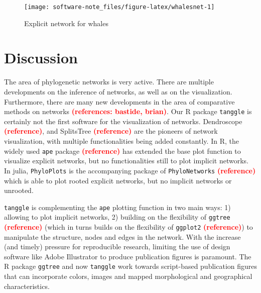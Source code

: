 \documentclass[]{article}
\begin{document}
\begin{figure}[H]

{\centering \texttt{[image: software-note\_files/figure-latex/whalesnet-1]} 

}

\caption{Explicit network for whales}\label{fig:whalesnet}
\end{figure}

\hypertarget{discussion}{%
\section{Discussion}\label{discussion}}

The area of phylogenetic networks is very active. There are multiple
developments on the inference of networks, as well as on the
visualization. Furthermore, there are many new developments in the area
of comparative methods on networks
\textcolor{red}{\textbf{(references: bastide, brian)}}. Our R package
\texttt{tanggle} is certainly not the first software for the
visualization of networks. Dendroscope
\textcolor{red}{\textbf{(reference)}}, and SplitsTree
\textcolor{red}{\textbf{(reference)}} are the pioneers of network
visualization, with multiple functionalities being added constantly. In
R, the widely used \texttt{ape} package
\textcolor{red}{\textbf{(reference)}} has extended the base plot
function to visualize explicit networks, but no functionalities still to
plot implicit networks. In julia, \texttt{PhyloPlots} is the
accompanying package of \texttt{PhyloNetworks}
\textcolor{red}{\textbf{(reference)}} which is able to plot rooted
explicit networks, but no implicit networks or unrooted.

\texttt{tanggle} is complementing the \texttt{ape} plotting function in
two main ways: 1) allowing to plot implicit networks, 2) building on the
flexibility of \texttt{ggtree} \textcolor{red}{\textbf{(reference)}}
(which in turns builds on the flexibility of \texttt{ggplot2}
\textcolor{red}{\textbf{(reference)}}) to manipulate the structure,
nodes and edges in the network. With the increase (and timely) pressure
for reproducible research, limiting the use of design software like
Adobe Illustrator to produce publication figures is paramount. The R
package \texttt{ggtree} and now \texttt{tanggle} work towards
script-based publication figures that can incorporate colors, images and
mapped morphological and geographical characteristics.


\end{document}
